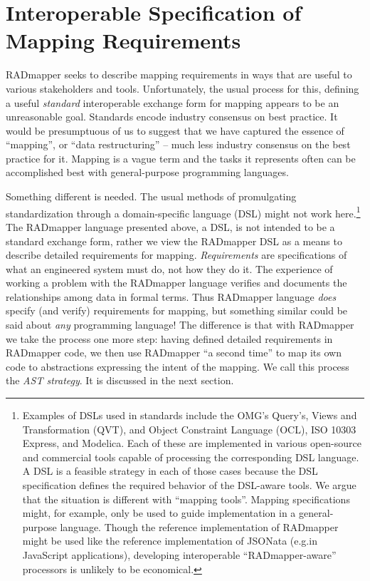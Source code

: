 \documentclass[9pt,letterpaper]{article}
\begin{document}
\section{Interoperable Specification of Mapping Requirements}

RADmapper seeks to describe mapping requirements in ways that are useful to various stakeholders and tools.
Unfortunately, the usual process for this, defining a useful \textit{standard} interoperable exchange form for mapping appears to be an unreasonable goal.
Standards encode industry consensus on best practice.
It would be presumptuous of us to suggest that we have captured the essence of ``mapping'', or ``data restructuring'' -- much less industry consensus on the best practice for it.
Mapping is a vague term and the tasks it represents often can be accomplished best with general-purpose programming languages.

Something different is needed.
The usual methods of promulgating standardization through a domain-specific language (DSL) might not work here.\footnote{Examples of DSLs used in standards include the OMG's Query's, Views and Transformation (QVT), and Object Constraint Language (OCL), ISO 10303 Express, and Modelica.
  Each of these are implemented in various open-source and commercial tools capable of processing the corresponding DSL language.
  A DSL is a feasible strategy in each of those cases because the DSL specification defines the required behavior of the DSL-aware tools.
  We argue that the situation is different  with ``mapping tools''.
  Mapping specifications might, for example, only be used to guide implementation in a general-purpose language.
  Though the reference implementation of RADmapper might be used like the reference implementation of JSONata (e.g.\@ in JavaScript applications), developing interoperable ``RADmapper-aware'' processors is unlikely to be economical.}
The RADmapper language presented above, a DSL, is not intended to be a standard exchange form, rather we view the RADmapper DSL as a means to describe detailed requirements for mapping.
\textit{Requirements} are specifications of what an engineered system must do, not how they do it.
The experience of working a problem with the RADmapper language verifies and documents the relationships among data in formal terms.
Thus RADmapper language \textit{does} specify (and verify) requirements for mapping, but something similar could be said about \textit{any} programming language!
The difference is that with RADmapper we take the process one more step: having defined detailed requirements in RADmapper code, we then use RADmapper ``a second time'' to map its own code to abstractions expressing the intent of the mapping.
We call this process the \textit{AST strategy}.
It is discussed in the next section.
\end{document}
